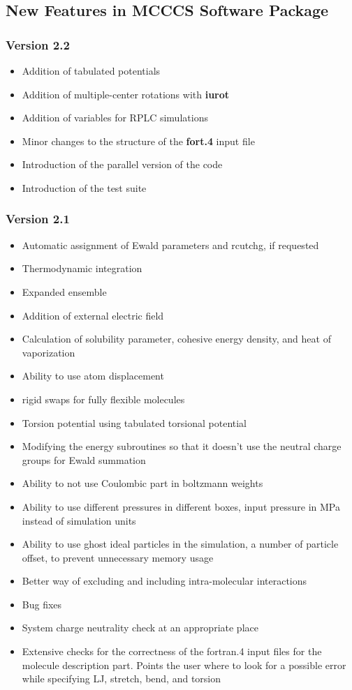 \documentclass[12pt,letterpaper]{article}
\begin{document}
\subsection{New Features in MCCCS Software Package}
\subsubsection{Version 2.2}
\begin{itemize}
\item Addition of tabulated potentials
\item Addition of multiple-center rotations with {\bf iurot}
\item Addition of variables for RPLC simulations
\item Minor changes to the structure of the {\bf fort.4} input file
\item Introduction of the parallel version of the code
\item Introduction of the test suite
\end{itemize}

\subsubsection{Version 2.1}
\begin{itemize}
\item Automatic assignment of Ewald parameters and rcutchg, if requested
\item Thermodynamic integration
\item Expanded ensemble
\item Addition of external electric field
\item Calculation of solubility parameter, cohesive energy density, and heat of vaporization
\item Ability to use atom displacement 
\item rigid swaps for fully flexible molecules
\item Torsion potential using tabulated torsional potential
\item Modifying the energy subroutines so that it doesn't use the neutral charge groups for Ewald summation
\item Ability to not use Coulombic part in boltzmann weights
\item Ability to use different pressures in different boxes, input pressure in MPa instead of simulation units
\item Ability to use ghost ideal particles in the simulation, a number of particle offset, to prevent unnecessary memory usage  
\item Better way of excluding and including intra-molecular interactions
\item Bug fixes  
\item System charge neutrality check at an appropriate place
\item Extensive checks for the correctness of the fortran.4 input files for the molecule description part. Points the user where to look for a possible error while specifying LJ, stretch, bend, and torsion 
\end{itemize}
\end{document}
